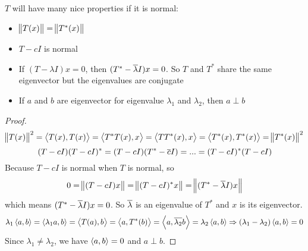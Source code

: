 \begin{theorem}
    $T$ will have many nice properties if it is normal:
\begin{itemize}
    \item $\norm{T(x)} = \norm{T^* (x)}$
    \item $T - cI$ is normal
    \item If $(T - \lambda I)x = 0$, then $(T^* - \overline{\lambda}I)x = 0$. So $T$ and $T^*$ share the same eigenvector but the eigenvalues are conjugate
    \item If $a$ and $b$ are eigenvector for eigenvalue $\lambda_1$ and $\lambda_2$, then $a \perp b$
\end{itemize}
\end{theorem}
\begin{proof}
    \begin{equation*}
        \norm{T(x)}^2 = \left\langle \displaystyle T(x), T(x) \right\rangle = \left\langle \displaystyle T^*T(x), x \right\rangle = \left\langle \displaystyle TT^*(x), x \right\rangle = \left\langle \displaystyle T^*(x), T^*(x) \right\rangle = \norm{T^*(x)}^2
    \end{equation*}
    \begin{equation*}
        (T-cI)(T-cI)^* = (T-cI)(T^* - \overline{c}I) = ... = (T-cI)^*(T-cI)
    \end{equation*}
    Because $T-cI$ is normal when $T$ is normal, so
    \begin{equation*}
        0 = \norm{(T-cI)x} = \norm{(T-cI)^* x} =  \norm{(T^*- \overline{\lambda} I)x}
    \end{equation*}
    which means $(T^*- \overline{\lambda} I)x = 0$. So $\overline{\lambda}$ is an eigenvalue of $T^*$ and $x$ is its eigenvector.
    \begin{equation*}
        \lambda_1 \left\langle \displaystyle a, b \right\rangle = \left\langle \displaystyle \lambda_1 a, b \right\rangle = \left\langle \displaystyle T(a), b \right\rangle = \left\langle \displaystyle a, T^*(b) \right\rangle = \left\langle \displaystyle a, \overline{\lambda_2}b \right\rangle = \lambda_2 \left\langle \displaystyle a, b \right\rangle \Rightarrow (\lambda_1 - \lambda_2)\left\langle \displaystyle a, b \right\rangle = 0
    \end{equation*}
    Since $\lambda_1 \neq \lambda_2$, we have $\left\langle \displaystyle a, b \right\rangle = 0$ and $a \perp b$.
\end{proof}


